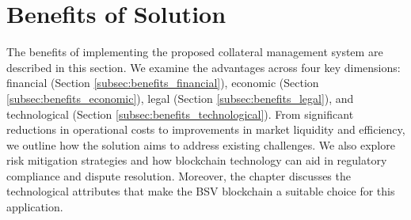 \section{Benefits of Solution}
\label{sec:benefits}
 The benefits of implementing the proposed collateral management system are described in this section. We examine the advantages across four key dimensions: financial (Section \ref{subsec:benefits_financial}), economic (Section \ref{subsec:benefits_economic}), legal (Section \ref{subsec:benefits_legal}), and technological (Section \ref{subsec:benefits_technological}). From significant reductions in operational costs to improvements in market liquidity and efficiency, we outline how the solution aims to address existing challenges. We also explore risk mitigation strategies and how blockchain technology can aid in regulatory compliance and dispute resolution. Moreover, the chapter discusses the technological attributes that make the BSV blockchain a suitable choice for this application.
